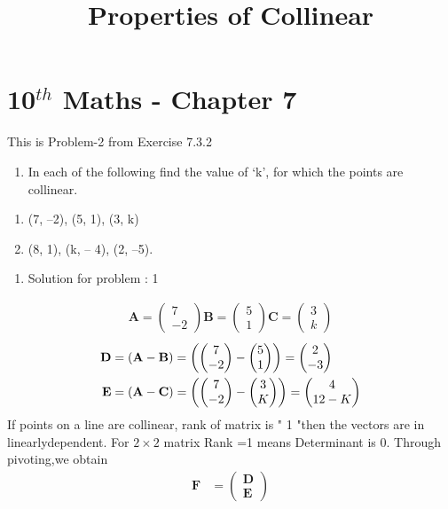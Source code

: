 \documentclass[12pt]{article}
\newcommand{\myvec}[1]{\ensuremath{\begin{pmatrix}#1\end{pmatrix}}}
\let\vec\mathbf
\providecommand{\brak}[1]{\ensuremath{\left(#1\right)}}
\let\vec\mathbf
\begin{document}
\begin{center}
\title{\textbf{Properties of Collinear}}
\date{\vspace{-5ex}} %
\maketitle
\end{center}
\setcounter{page}{1}
\section{10$^{th}$ Maths - Chapter 7}
This is Problem-2 from Exercise 7.3.2
\begin{enumerate}
\item In each of the following find the value of ‘k’, for which the points are collinear.
\end{enumerate}
\begin{enumerate}
\item (7, –2), (5, 1), (3, k) \\
\item (8, 1), (k, – 4), (2, –5).\\
\end{enumerate}
\begin{enumerate} 
\item Solution for problem : 1
\end{enumerate}
\begin{align}  
\vec{A}=\myvec{7 \\-2}
\vec{B}=\myvec{5 \\ 1}
\vec{C}=\myvec{3 \\ k}
\end{align}
\begin{align}
\vec{D} &=\brak{\vec{A}-\vec{B}} = \brak{\myvec{7 \\-2 } - \myvec{5 \\1 } } = \myvec{2 \\ -3 }\\
\vec{E} &= \brak{\vec{A}-\vec{C}} = \brak{\myvec{7 \\ -2 } - \myvec{3 \\K } } = \myvec{4 \\1\-2-K}
\end{align}
 If points on a line  are  collinear, rank of matrix is " 1 "then the vectors are in linearlydependent.
For $2\times2$ matrix Rank =1 means Determinant is 0.
Through pivoting,we obtain
\begin{align}
\vec{F} &={\myvec{\vec{D}\\ \vec{E}}}
\end{align}
\end{document}
